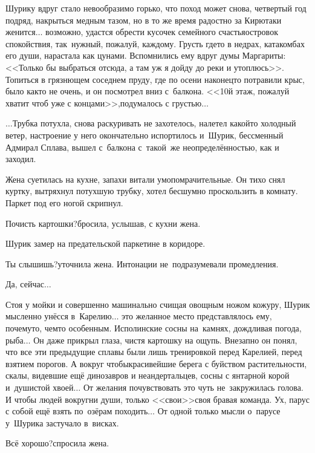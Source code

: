 {	Шурику вдруг стало невообразимо горько, что поход может снова, четвертый год подряд, накрыться медным тазом, но в то же время радостно за Кирю\mdash таки женится$\ldots$ возможно, удастся обрести кусочек семейного счастья\mdash островок спокойствия, так~нужный, пожалуй, каждому. Грусть где\sdash то в недрах, катакомбах его души, нарастала как цунами. Вспомнились ему вдруг думы Маргариты: <<Только бы выбраться отсюда, а там уж я дойду до реки и утоплюсь>>\cite{МастерМаргарита}. Топиться в грязнющем соседнем пруду, где по осени наконец\sdash то потравили крыс, было как\sdash то не очень, и он посмотрел вниз с~балкона. <<10\sdash й этаж, пожалуй хватит чтоб уже с концами>>,\mdash подумалось с грустью$\ldots$
	
	$\ldots$Трубка потухла, снова раскуривать не захотелось, налетел какой\sdash то холодный ветер, настроение у него окончательно испортилось и~Шурик, бессменный Адмирал Сплава, вышел с~балкона с~такой~же неопределённостью, как и заходил.
	
	Жена суетилась на кухне, запахи витали умопомрачительные. Он тихо снял куртку, вытряхнул потухшую трубку, хотел бесшумно проскользить в комнату. Паркет под его ногой скрипнул. 
	
	\diagdash Почисть картошки?\mdash бросила, услышав, с кухни жена.
	
	Шурик замер на предательской паркетине в коридоре.
	
	\diagdash Ты слышишь?\mdash уточнила жена. Интонации не~подразумевали промедления.
	
	\diagdash Да, сейчас$\ldots$
	
	Стоя у мойки и совершенно машинально счищая овощным ножом кожуру, Шурик мысленно унёсся в~Карелию$\ldots$ это желанное место представлялось ему, почему\sdash то, чем\sdash то особенным. Исполинские сосны на~камнях, дождливая погода, рыба$\ldots$ Он даже прикрыл глаза, чистя картошку на ощупь. Внезапно он понял, что все эти предыдущие сплавы были лишь тренировкой перед Карелией, перед взятием порогов. А вокруг чтобы\mdash красивейшие берега с буйством растительности, скалы, видевшие ещё динозавров и неандертальцев, сосны с янтарной корой и~душистой хвоей$\ldots$ От желания почувствовать это чуть не~закружилась голова. И чтобы людей вокруг\mdash ни души, только <<свои>>\mdash своя бравая команда. Ух, парус с собой ещё взять по~озёрам походить$\ldots$ От одной только мысли о~парусе у~Шурика застучало в~висках.
	
	\diagdash Всё хорошо?\mdash спросила жена.
	
}
